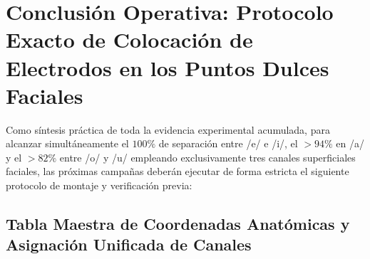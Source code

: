 \documentclass[11pt,a4paper]{article}
\begin{document}
\section{Conclusión Operativa: Protocolo Exacto de Colocación de Electrodos en los Puntos Dulces Faciales}

Como síntesis práctica de toda la evidencia experimental acumulada, para alcanzar simultáneamente el $100\%$ de separación entre /e/ e /i/, el $>94\%$ en /a/ y el $>82\%$ entre /o/ y /u/ empleando exclusivamente tres canales superficiales faciales, las próximas campañas deberán ejecutar de forma estricta el siguiente protocolo de montaje y verificación previa:

\subsection{Tabla Maestra de Coordenadas Anatómicas y Asignación Unificada de Canales}
\end{document}
